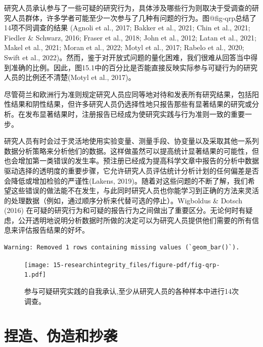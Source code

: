\documentclass[
  letterpaper,
  DIV=11,
  numbers=noendperiod]{scrreprt}
\begin{document}
研究人员承认参与了一些可疑的研究行为，具体涉及哪些行为则取决于受调查的研究人员群体，许多学者可能至少一次参与了几种有问题的行为。图@fig-qrp总结了14项不同调查的结果
(Agnoli et al., 2017; Bakker et al., 2021; Chin et al., 2021; Fiedler \&
Schwarz, 2016; Fraser et al., 2018; John et al., 2012; Latan et al.,
2021; Makel et al., 2021; Moran et al., 2022; Motyl et al., 2017; Rabelo
et al., 2020; Swift et al.,
2022)。然而，鉴于对开放式问题的量化困难，我们很难从回答当中得到准确的比例。因此，图15.1中的百分比是否能直接反映实际参与可疑行为的研究人员的比例还不清楚(Motyl
et al., 2017)。

尽管荷兰和欧洲行为准则规定研究人员应同等地对待和发表所有研究结果，包括阳性结果和阴性结果，但许多研究人员仍选择性地只报告那些有显著结果的研究或分析。在发布显著结果时，注册报告已经成为使研究实践与行为准则一致的重要一步。

研究人员有时会过于灵活地使用实验变量、测量手段、协变量以及采取其他一系列数据分析策略来分析他们的数据。这样做虽然可以提高统计显著结果的可能性，但也会增加第一类错误的发生率。预注册已经成为提高科学文章中报告的分析中数据驱动选择的透明度的重要步骤，它允许研究人员评估统计分析计划的任何偏差是否会降低或增加检验的严谨性(Lakens,
2019)。随着对这些问题的不断了解，我们希望这些错误的做法能不在发生，与此同时研究人员也你能学习到正确的方法来灵活的处理数据（例如，通过顺序分析来代替可选的停止）。Wigboldus
\& Dotsch (2016)
在可疑的研究行为和可疑的报告行为之间做出了重要区分。无论何时有疑虑，公开透明地说明分析数据时所做的决定可以为研究人员提供他们需要的所有信息来评估报告结果的好坏。

\begin{verbatim}
Warning: Removed 1 rows containing missing values (`geom_bar()`).
\end{verbatim}

\begin{figure}

{\centering \texttt{[image: 15-researchintegrity\_files/figure-pdf/fig-qrp-1.pdf]}

}

\caption{\label{fig-qrp}参与可疑研究实践的自我承认,至少从研究人员的各种样本中进行14次调查。}

\end{figure}

\hypertarget{ux634fux9020ux4f2aux9020ux548cux6284ux88ad}{%
\section{捏造、伪造和抄袭}\label{ux634fux9020ux4f2aux9020ux548cux6284ux88ad}}
\end{document}
